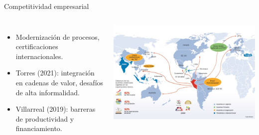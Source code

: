 \documentclass[aspectratio=169]{beamer}
\begin{document}
\begin{frame}{\Large Competitividad empresarial}
    \begin{columns}
            \raggedleft %
            \Large
            \begin{itemize}
                \item Modernización de procesos, certificaciones internacionales.
                \item Torres (2021): integración en cadenas de valor, desafíos de alta informalidad.
                \item Villarreal (2019): barreras de productividad y financiamiento.
            \end{itemize}
            \includegraphics[width=\textwidth]{./images/cgv.png} %
    \end{columns}

\end{frame}
\end{document}
